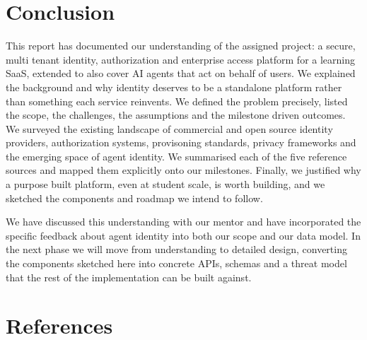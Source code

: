 \documentclass[11pt,a4paper]{article}
\begin{document}
\section{Conclusion}

This report has documented our understanding of the assigned project: a secure, multi tenant identity, authorization and enterprise access platform for a learning SaaS, extended to also cover AI agents that act on behalf of users. We explained the background and why identity deserves to be a standalone platform rather than something each service reinvents. We defined the problem precisely, listed the scope, the challenges, the assumptions and the milestone driven outcomes. We surveyed the existing landscape of commercial and open source identity providers, authorization systems, provisoning standards, privacy frameworks and the emerging space of agent identity. We summarised each of the five reference sources and mapped them explicitly onto our milestones. Finally, we justified why a purpose built platform, even at student scale, is worth building, and we sketched the components and roadmap we intend to follow.

We have discussed this understanding with our mentor and have incorporated the specific feedback about agent identity into both our scope and our data model. In the next phase we will move from understanding to detailed design, converting the components sketched here into concrete APIs, schemas and a threat model that the rest of the implementation can be built against.

\section*{References}
\end{document}
